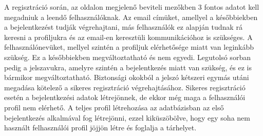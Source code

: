 \documentclass[12pt, twoside]{report}
\begin{document}
A regisztráció során, az oldalon megjelenő beviteli mezőkben 3 fontos adatot kell megadniuk a leendő felhasználóknak. Az email címüket, amellyel a későbbiekben a bejelentkezést tudják végrehajtani, más felhasználók ez alapján tudnak rá keresni a profiljukra és az email-en keresztüli kommunikációhoz is szükséges. A felhasználónevüket, mellyel szintén a profiljuk elérhetősége miatt van leginkább szükség. Ez a későbbiekben megváltoztatható és nem egyedi. Legutolsó sorban pedig a jelszavukra, amelyre szintén a bejelentkezés miatt van szükség, és ez is bármikor megváltoztatható. Biztonsági okokból a jelszó kétszeri egymás utáni megadása kötelező a sikeres regisztráció végrehajtásához. Sikeres regisztráció esetén a bejelentkezési adatok létrejönnek, de ekkor még maga a felhasználói profil nem elérhető. A teljes profil létrehozása az adatbázisban az első bejelentkezés alkalmával fog létrejönni, ezzel kiküszöbölve, hogy egy soha nem használt felhasználói profil jöjjön létre és foglalja a tárhelyet.
\end{document}
